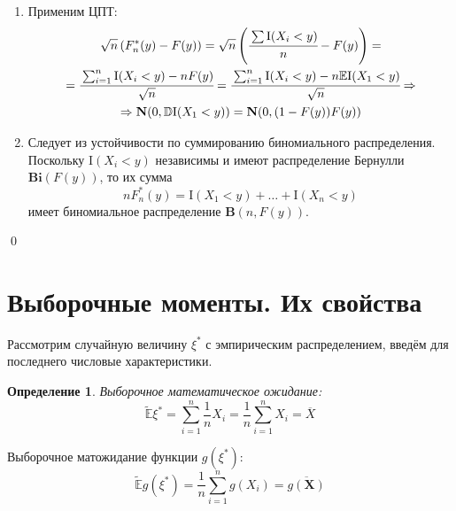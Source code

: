 \documentclass[oneside,final,14pt]{extreport}
\renewenvironment{proof}{{\bfseries Доказательство.}}{\qed}
\theoremstyle{definition}
\newtheorem{defn}{Определение}[section]
\begin{document}
\begin{proof}
\begin{enumerate}
\begin{enumerate}[label={\arabic*)}]
        \item Применим ЦПТ:
        \begin{multline*}
            \sqrt{n}\left(F_{n}^{*}(y)-F(y)\right)
            = \sqrt{n}\left(\cfrac{\sum \mathrm{I}(X_{i}<y)}{n}-F(y)\right) 
            = \\
            = \cfrac{\sum_{i=1}^{n} \mathrm{I}(X_{i}<y)-n F(y)}{\sqrt{n}} 
            = \cfrac{\sum_{i=1}^{n} \mathrm{I}(X_{i}<y)-n \mathbb{E}\mathrm{I}(X_{1}<y)}{\sqrt{n}} 
            \Rightarrow \\
            \Rightarrow \mathbf{N}(0, \mathbb{D}\mathrm{I}(X_{1}<y))
            = \mathbf{N}(0, (1-F(y))F(y))
        \end{multline*}
        \item Следует из устойчивости по суммированию биномиального распределения. Поскольку $\mathrm{I}\left(X_{i}<y\right)$ независимы и имеют распределение Бернулли $\mathbf{Bi}(F(y))$, то их сумма
        \begin{equation*}
            n F_{n}^{*}(y)=\mathrm{I}\left(X_{1}<y\right)+\ldots+\mathrm{I}\left(X_{n}<y\right)
        \end{equation*}
        имеет биномиальное распределение $\mathbf{B}(n, F(y))$.
    \end{enumerate}
\end{enumerate}  
\end{proof}

\section{Выборочные моменты. Их свойства}

Рассмотрим случайную величину $\xi^{*}$ с эмпирическим распределением, введём для последнего числовые характеристики.

\begin{defn}
{\it Выборочное математическое ожидание:} 
\begin{equation*}
    \tilde{\mathbb{E}} \xi^{*}=\sum_{i=1}^{n} \frac{1}{n} X_{i}=\frac{1}{n} \sum_{i=1}^{n} X_{i}=\overline{X}
\end{equation*}

Выборочное матожидание функции $g(\xi^{*})$:
\begin{equation*}
    \tilde{\mathbb{E}} g\left(\xi^{*}\right)=\frac{1}{n} \sum_{i=1}^{n} g\left(X_{i}\right)=\overline{g(\mathbf{X})}
\end{equation*}
\end{defn}
\end{document}
